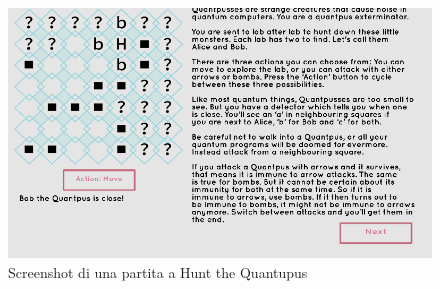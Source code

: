 \documentclass{book}
\theoremstyle{definition}
\theoremstyle{definition}
\theoremstyle{definition}
\theoremstyle{plain}
\theoremstyle{plain}
\theoremstyle{plain}
\theoremstyle{plain}
\begin{document}
\begin{figure}[h!]
\captionsetup{font=scriptsize}
\begin{center}
    \includegraphics[width=1\textwidth]{Immagini troppo complicate/hunt_the_quantupus.png}
\end{center}
\caption{\scriptsize Screenshot di una partita a Hunt the Quantupus\cite{wootton_quantupus}}\label{fig:img_quantupus}
\end{figure} \\

\newpage
\end{document}
